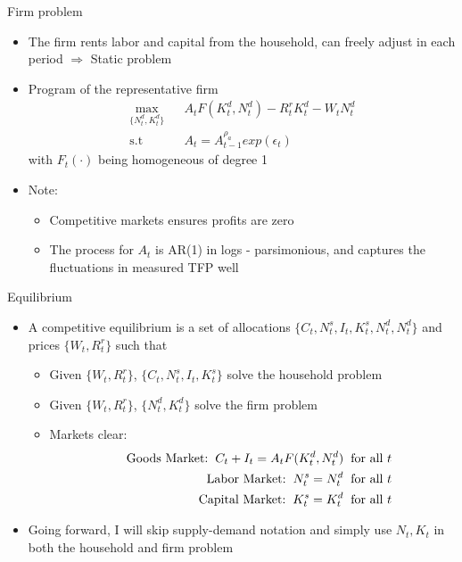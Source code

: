 \documentclass[9pt,xcolor={dvipsnames}]{beamer}
\newcommand{\bit}{\begin{itemize}}
\newcommand{\eit}{\end{itemize}}
\newcommand{\bc}{\color{blue}}
\begin{document}
\begin{frame}{Firm problem}

\bit
\setlength\itemsep{1.5em}

\item The firm rents labor and capital from the household, can freely adjust in each period $\Rightarrow$ Static problem

\item Program of the representative firm 
\begin{eqnarray}
\max_{\{N^d_t, K^d_{t}\}} && A_t F(K^d_t, N^d_t) - R^{r}_t K^d_t - W_t N^d_t \nonumber \\
\text{s.t} && A_t = A_{t-1}^{\rho_a}exp(\epsilon_t) \nonumber
\end{eqnarray}
with $F_t(\cdot)$ being {\bc homogeneous of degree 1}

\item Note:
\bit
\setlength\itemsep{0.5em}
\item Competitive markets ensures profits are zero

\item The process for $A_t$ is AR(1) in logs - parsimonious, and captures the fluctuations in measured TFP well
\eit

\eit

\end{frame}

\begin{frame}{Equilibrium}

\bit
\setlength\itemsep{1.5em}

\item A {\bc competitive equilibrium} is a set of allocations $\{C_t, N^s_t, I_t, K^s_t, N^d_t, N^d_t\}$ and prices $\{W_t, R^{r}_t\}$ such that
\bit
\setlength\itemsep{1em}
	\item Given $\{W_t, R^{r}_t\}$, $\{C_t, N^s_t, I_t, K^s_t\}$ solve the household problem
	
	\item Given $\{W_t, R^{r}_t\}$, $\{N^d_t, K^d_t\}$ solve the firm problem
	
	\item Markets clear:
	\begin{eqnarray}
		&& \text{Goods Market:} \hspace{2mm} C_t + I_t = A_t F(K^d_t, N^d_t)  \hspace{2mm} \text{for all } t \nonumber \\
		&& \text{Labor Market:} \hspace{2mm} N^s_t = N^d_t  \hspace{2mm} \text{for all } t \nonumber \\	
		&& \text{Capital Market:} \hspace{2mm} K^s_t = K^d_t  \hspace{2mm} \text{for all } t \nonumber
	\end{eqnarray}
\eit

\item Going forward, I will skip supply-demand notation and simply use $N_t, K_t$ in both the household and firm problem

\eit

\end{frame}
\end{document}
